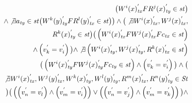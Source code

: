 \documentclass{sig-alternate-05-2015}
\begin{document}
\begin{align}
\begin{split}
 \big(  {W^i}(x)^{'}_\mathit{tx} F {R^j}(x)^{'}_\mathit{ty} \in \mathit{st} \big) \\
  \wedge  \not\exists a_\mathit{ty} \in \mathit{st}
 \big( {W^k}(y)^{'}_\mathit{ty} F {R^l}(y)^{'}_\mathit{tx} \in \mathit{st}  \big) \big) \wedge
 \big( \not\exists  {W^i}(x)^{'}_\mathit{tx}, {W^j}(x)^{'}_\mathit{tx}, \\ {R^k}(x)^{'}_\mathit{ty} \in  \mathit{st}  \big)
 \big( \left( {W^i}(x)^{'}_\mathit{tx}  F {W^j}(x)^{'}_\mathit{tx} F  c_\mathit{tx} \in  \mathit{st} \right) \\
   \wedge \left( v_k^{'} = v_i^{'} \right)  \big)  \wedge
   \not\exists \left( {W^i}(x)^{'}_\mathit{ty}, {W^j}(x)^{'}_\mathit{ty}, {R^k}(x)^{'}_\mathit{tx} \in  \mathit{st} \right) \\
    \big( \left(
 {W^i}(x)^{'}_\mathit{ty}  F {W^j}(x)^{'}_\mathit{ty} F  c_\mathit{ty} \in  \mathit{st} \right)
   \wedge \left( v_k^{'} = v_i^{'} \right)  \big) \wedge
  \big( \\ \not\exists {W^i}(x)^{'}_\mathit{tx},  {W^j}(y)^{'}_\mathit{tx},
  {W^k}(x)^{'}_\mathit{ty}, {W^l}(y)^{'}_\mathit{ty}, {R^m}(x)^{'}_\mathit{tx}, {R^n}(y)^{'}_\mathit{ty} \in \mathit{St} \\ \big)
\big( \left( \left( v_n^{'} = v_l^{'} \right) \wedge \left( v_m^{'} = v_i^{'} \right) \right) \vee \left( \left( v_n^{'} = v_j^{'} \right) \wedge \left( v_m^{'} = v_k^{'} \right) \right)  \big) \wedge \\

\end{split}
\end{align}
\end{document}
